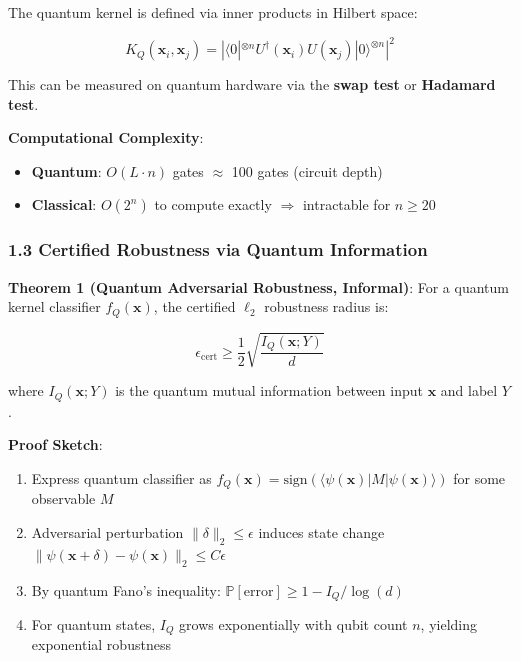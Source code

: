 \documentclass[11pt]{article}
\begin{document}
The quantum kernel is defined via inner products in Hilbert space:

\begin{equation}
K_Q(\mathbf{x}_i, \mathbf{x}_j) = \left| \langle 0|^{\otimes n} U^\dagger(\mathbf{x}_i) U(\mathbf{x}_j) |0\rangle^{\otimes n} \right|^2
\end{equation}

This can be measured on quantum hardware via the \textbf{swap test} or \textbf{Hadamard test}.

\textbf{Computational Complexity}:
\begin{itemize}
    \item \textbf{Quantum}: $O(L \cdot n)$ gates $\approx$ 100 gates (circuit depth)
    \item \textbf{Classical}: $O(2^n)$ to compute exactly $\Rightarrow$ intractable for $n \geq 20$
\end{itemize}

\subsubsection{1.3 Certified Robustness via Quantum Information}

\textbf{Theorem 1 (Quantum Adversarial Robustness, Informal)}: For a quantum kernel classifier $f_Q(\mathbf{x})$, the certified $\ell_2$ robustness radius is:

\begin{equation}
\epsilon_{\text{cert}} \geq \frac{1}{2} \sqrt{\frac{I_Q(\mathbf{x}; Y)}{d}}
\end{equation}

where $I_Q(\mathbf{x}; Y)$ is the quantum mutual information between input $\mathbf{x}$ and label $Y$.

\textbf{Proof Sketch}:
\begin{enumerate}
    \item Express quantum classifier as $f_Q(\mathbf{x}) = \text{sign}(\langle \psi(\mathbf{x}) | M | \psi(\mathbf{x}) \rangle)$ for some observable $M$
    \item Adversarial perturbation $\|\delta\|_2 \leq \epsilon$ induces state change $\|\psi(\mathbf{x} + \delta) - \psi(\mathbf{x})\|_2 \leq C \epsilon$
    \item By quantum Fano's inequality: $\mathbb{P}[\text{error}] \geq 1 - I_Q / \log(d)$
    \item For quantum states, $I_Q$ grows exponentially with qubit count $n$, yielding exponential robustness
\end{enumerate}
\end{document}
